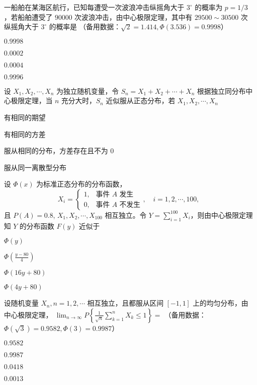 \documentclass{exam-zh}
\begin{document}
\begin{question}
  一船舶在某海区航行，已知每遭受一次波浪冲击纵摇角大于 $3^\circ$ 的概率为 $p=1/3$，若船舶遭受了 $90000$ 次波浪冲击，由中心极限定理，其中有 $29500\sim30500$ 次纵摇角大于 $3^\circ$ 的概率是 
  （备用数据：$\sqrt{2}=1.414, \Phi(3.536)=0.9998$）
  \paren[D]

  \begin{choices}
    \item $0.9998$
    \item $0.0002$
    \item $0.0004$
    \item $0.9996$
  \end{choices}
\end{question}

\begin{question}
  设 $X_1, X_2, \cdots, X_n$ 为独立随机变量，令
  $S_n = X_1 + X_2 + \cdots + X_n$
  根据独立同分布中心极限定理，当 $n$ 充分大时，$S_n$ 近似服从正态分布，若
  $X_1, X_2, \cdots, X_n $
  \paren[C]
  \begin{choices}
    \item 有相同的期望
    \item 有相同的方差
    \item 服从相同的分布，方差存在且不为 0
    \item 服从同一离散型分布
  \end{choices}
\end{question}

\begin{question}
  设 $\Phi(x)$ 为标准正态分布的分布函数，
  $$
  X_i = 
  \begin{cases} 
  1, & \text{事件 } A \text{ 发生} \\ 
  0, & \text{事件 } A \text{ 不发生}
  \end{cases}, \quad i=1,2,\cdots,100,
  $$
  且 $P(A)=0.8$, $X_1, X_2, \cdots, X_{100}$ 相互独立。令 $Y = \sum_{i=1}^{100} X_i$，则由中心极限定理知 $Y$ 的分布函数 $F(y)$ 近似于 \paren[B]

  \begin{choices}
    \item $\Phi(y)$
    \item $\Phi(\frac{y-80}{4})$
    \item $\Phi(16y + 80)$
    \item $\Phi(4y + 80)$
  \end{choices}
\end{question}

\begin{question}
  设随机变量 $X_n, n=1,2,\cdots$ 相互独立，且都服从区间 $[-1,1]$ 上的均匀分布，由中心极限定理，
  $\lim_{n \to \infty} P \left\{ \frac{1}{\sqrt{n}} \sum_{k=1}^n X_k \leq 1 \right\} =$
  （备用数据：$\Phi(\sqrt{3}) = 0.9582, \Phi(3) = 0.9987$）
  \paren[A]

  \begin{choices}
    \item $0.9582$
    \item $0.9987$
    \item $0.0418$
    \item $0.0013$
  \end{choices}
\end{question}
\end{document}
